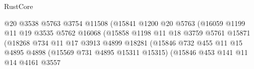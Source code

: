 \begin{lexlean}{RustCore}
\begin{coremodule}
                                              @20
                                              @3538
                                              @5763
                                              @3754
                                              @11508
                                              (@15841
                                                @1200
                                                @20
                                                @5763
                                                (@16059
                                                  @1199
                                                  @11
                                                  @19
                                                  @3535
                                                  @5762
                                                  @16068
                                                  (@15858
                                                    @1198
                                                    @11
                                                    @18
                                                    @3759
                                                    @5761
                                                    @15871
                                                    (@18268
                                                      @734
                                                      @11
                                                      @17
                                                      @3913
                                                      @4899
                                                      @18281
                                                      (@15846
                                                        @732
                                                        @455
                                                        @11
                                                        @15
                                                        @4895
                                                        @4898
                                                        (@15569 @731 @4895 @15311 @15315)
                                                        (@15846
                                                          @453
                                                          @141
                                                          @11
                                                          @14
                                                          @4161
                                                          @3557

\end{coremodule}
\end{lexlean}

